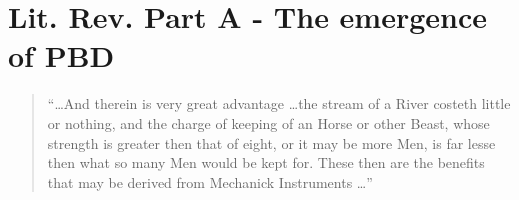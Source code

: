 \documentclass[a4paper, 12pt]{article}
\begin{document}





% 











\chapter{Lit. Rev. Part A - The emergence of PBD}
\label{part:a}


\begin{quotation}
        ``\dots And therein is very great advantage \dots the stream of a River costeth little or nothing, and the charge of keeping of an Horse or other Beast, whose strength is greater then that of eight, or it may be more Men, is far lesse then what so many Men would be kept for. These then are the benefits that may be derived from Mechanick Instruments \dots''
        \citet[p.~4]{galilei_mechanics_1665}
\end{quotation}
\end{document}
